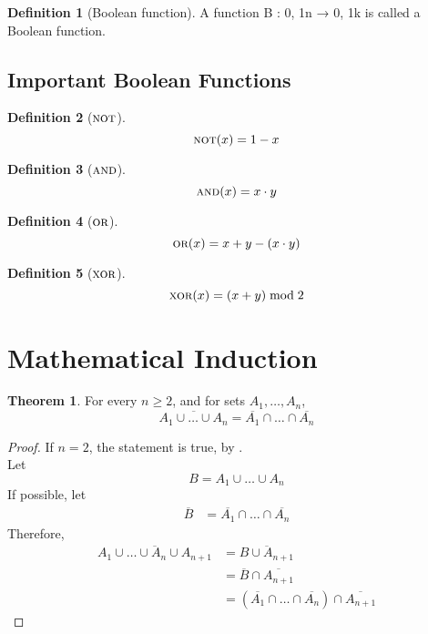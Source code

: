 \documentclass[fleqn, a4paper, 12pt, twoside]{article}
\theoremstyle{definition}
\newtheorem{definition}{Definition}
\theoremstyle{theorem}
\newtheorem{theorem}{Theorem}
\newcommand{\Not}{{\textsc{not}}}
\renewcommand{\And}{{\textsc{and}}}
\newcommand{\Or}{{\textsc{or}}}
\newcommand{\Xor}{{\textsc{xor}}}
\begin{document}
\begin{definition}[Boolean function]
	A function B : {0, 1}n → {0, 1}k is called a Boolean function.
\end{definition}

\subsection{Important Boolean Functions}

\begin{definition}[$\Not$]
	\begin{equation*}
		\Not(x) = 1 - x
	\end{equation*}
\end{definition}

\begin{definition}[$\And$]
	\begin{equation*}
		\And(x) = x \cdot y
	\end{equation*}
\end{definition}

\begin{definition}[$\Or$]
	\begin{equation*}
		\Or(x) = x + y - (x \cdot y)
	\end{equation*}
\end{definition}

\begin{definition}[$\Xor$]
	\begin{equation*}
		\Xor(x) = (x + y) \bmod{2}
	\end{equation*}
\end{definition}

\section{Mathematical Induction}

\begin{theorem}
	For every $n \geq 2$, and for sets $A_1, \dots, A_n$,
	\begin{equation*}
		\overline{A_1 \cup \dots \cup A_n} = \overline{A_1} \cap \dots \cap \overline{A_n}
	\end{equation*}
\end{theorem}

\begin{proof}
	If $n = 2$, the statement is true, by .\\
	Let
	\begin{equation*}
		B = A_1 \cup \dots \cup A_n
	\end{equation*}
	If possible, let
	\begin{align*}
		\overline{B} &= \overline{A_1} \cap \dots \cap \overline{A_n}
	\end{align*}
	Therefore,
	\begin{align*}
		\overline{A_1 \cup \dots \cup A_n \cup A_{n + 1}} &= \overline{B \cup A_{n + 1}}\\
		&= \overline{B} \cap \overline{A_{n + 1}}\\
		&= (\overline{A_1} \cap \dots \cap \overline{A_n}) \cap \overline{A_{n + 1}}
	\end{align*}
\end{proof}
\end{document}
